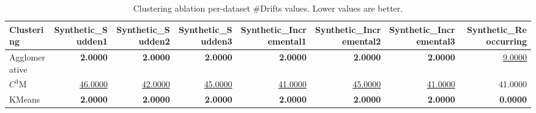 \begin{table}
\caption{Clustering ablation per-dataset \#Drifts values. Lower values are better.}
\label{tab:per-data-clustering-ablation-n-drifts-detected}
\begin{tabular}{lrrrrrrr}
\toprule
Clustering & Synthetic\_Sudden1 & Synthetic\_Sudden2 & Synthetic\_Sudden3 & Synthetic\_Incremental1 & Synthetic\_Incremental2 & Synthetic\_Incremental3 & Synthetic\_Reoccurring \\
\midrule
Agglomerative & \textbf{2.0000} & \textbf{2.0000} & \textbf{2.0000} & \textbf{2.0000} & \textbf{2.0000} & \textbf{2.0000} & \underline{9.0000} \\
$C^3$M & \underline{46.0000} & \underline{42.0000} & \underline{45.0000} & \underline{41.0000} & \underline{45.0000} & \underline{41.0000} & 41.0000 \\
KMeans & \textbf{2.0000} & \textbf{2.0000} & \textbf{2.0000} & \textbf{2.0000} & \textbf{2.0000} & \textbf{2.0000} & \textbf{0.0000} \\
\bottomrule
\end{tabular}
\end{table}
